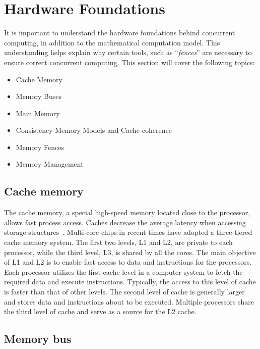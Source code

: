 \section{\label{sec:hardware-foundations}Hardware Foundations}

It is important to understand the hardware foundations behind concurrent computing, in addition to the mathematical computation model. This understanding helps explain why certain tools, such as ``\emph{fences}'' are necessary to ensure correct concurrent computing. This section will cover the following topics:

\begin{itemize}
\item Cache Memory
\item Memory Buses
\item Main Memory
\item Consistency Memory Models and Cache coherence
\item Memory Fences
\item Memory Management
\end{itemize}

\subsection{Cache memory}
\label{sec:org49cf4b1}

The cache memory, a special high-speed memory located close to the processor, allows fast process access. Caches decrease the average latency when accessing storage structures~\cite{DBLP_series_synthesis_2020Nagarajan}. Multi-core chips in recent times have adopted a three-tiered cache memory system. The first two levels, L1 and L2, are private to each processor, while the third level, L3, is shared by all the cores. The main objective of L1 and L2 is to enable fast access to data and instructions for the processors.
Each processor utilizes the first cache level in a computer system to fetch the required data and execute instructions. Typically, the access to this level of cache is faster than that of other levels. The second level of cache is generally larger and stores data and instructions about to be executed. Multiple processors share the third level of cache and serve as a source for the L2 cache.

\subsection{Memory bus}
\label{sec:orgda21942}

